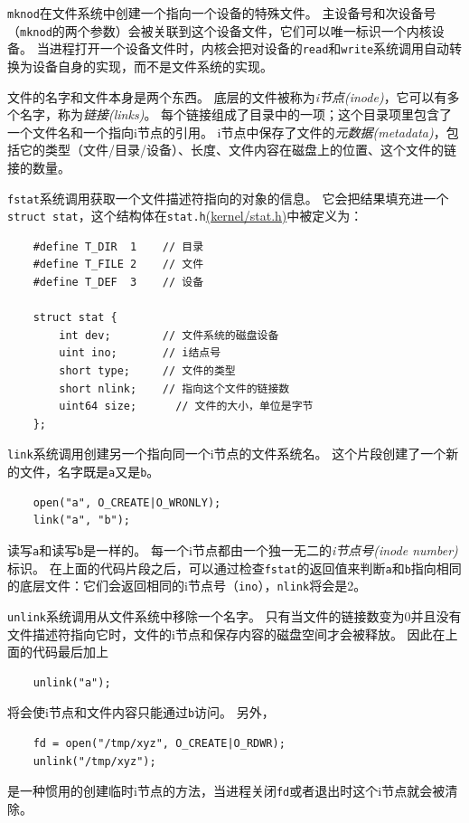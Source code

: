 \texttt{mknod}在文件系统中创建一个指向一个设备的特殊文件。
主设备号和次设备号（\texttt{mknod}的两个参数）会被关联到这个设备文件，它们可以唯一标识一个内核设备。
当进程打开一个设备文件时，内核会把对设备的\texttt{read}和\texttt{write}系统调用自动转换为设备自身的实现，而不是文件系统的实现。

文件的名字和文件本身是两个东西。
底层的文件被称为\emph{i节点(inode)}，它可以有多个名字，称为\emph{链接(links)}。
每个链接组成了目录中的一项；这个目录项里包含了一个文件名和一个指向i节点的引用。
i节点中保存了文件的\emph{元数据(metadata)}，包括它的类型（文件/目录/设备）、长度、文件内容在磁盘上的位置、这个文件的链接的数量。

\texttt{fstat}系统调用获取一个文件描述符指向的对象的信息。
它会把结果填充进一个\texttt{struct stat}，这个结构体在\texttt{stat.h}\href{https://github.com/mit-pdos/xv6-riscv/blob/risc/kernel/stat.h}{(kernel/stat.h)}中被定义为：
\begin{lstlisting}
    #define T_DIR  1    // 目录
    #define T_FILE 2    // 文件
    #define T_DEF  3    // 设备

    struct stat {
        int dev;        // 文件系统的磁盘设备
        uint ino;       // i结点号
        short type;     // 文件的类型
        short nlink;    // 指向这个文件的链接数
        uint64 size;      // 文件的大小，单位是字节
    };
\end{lstlisting}

\texttt{link}系统调用创建另一个指向同一个i节点的文件系统名。
这个片段创建了一个新的文件，名字既是\texttt{a}又是\texttt{b}。

\begin{lstlisting}
    open("a", O_CREATE|O_WRONLY);
    link("a", "b");
\end{lstlisting}

读写\texttt{a}和读写\texttt{b}是一样的。
每一个i节点都由一个独一无二的\emph{i节点号(inode number)}标识。
在上面的代码片段之后，可以通过检查\texttt{fstat}的返回值来判断\texttt{a}和\texttt{b}指向相同的底层文件：它们会返回相同的i节点号（\texttt{ino}），\texttt{nlink}将会是2。

\texttt{unlink}系统调用从文件系统中移除一个名字。
只有当文件的链接数变为0并且没有文件描述符指向它时，文件的i节点和保存内容的磁盘空间才会被释放。
因此在上面的代码最后加上
\begin{lstlisting}
    unlink("a");
\end{lstlisting}
将会使i节点和文件内容只能通过\texttt{b}访问。
另外，
\begin{lstlisting}
    fd = open("/tmp/xyz", O_CREATE|O_RDWR);
    unlink("/tmp/xyz");
\end{lstlisting}
是一种惯用的创建临时i节点的方法，当进程关闭\texttt{fd}或者退出时这个i节点就会被清除。

